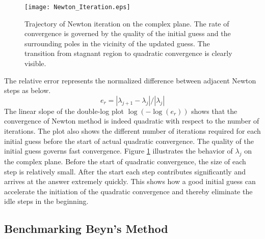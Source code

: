 \documentclass[11pt,letterpaper]{article}
\begin{document}
\begin{figure}\label{fig:NewtonIterate}
\begin{center}
\texttt{[image: Newton\_Iteration.eps]}
\end{center}
\caption{Trajectory of Newton iteration on the complex plane. \textnormal{The rate of convergence is governed by the quality of the initial guess and the surrounding poles in the vicinity of the updated guess. The transition from stagnant region to quadratic convergence is clearly visible.}} 
\end{figure}
The relative error represents the normalized difference between adjacent Newton steps as below.
\begin{equation}\label{eq:er}
e_r=|\lambda_{j+1} - \lambda_j|/|\lambda_j|
\end{equation}
The linear slope of the double-log plot $\log(-\log(e_r))$ shows that the convergence of Newton method is indeed quadratic with respect to the number of iterations. The plot also shows the different number of iterations required for each initial guess before the start of actual quadratic convergence. The quality of the initial guess governs fast convergence. Figure \ref{fig:NewtonIterate} illustrates the behavior of $\lambda_j$ on the complex plane. Before the start of quadratic convergence, the size of each step is relatively small. After the start each step contributes significantly and arrives at the answer extremely quickly. This shows how a good initial guess can accelerate the initiation of the quadratic convergence and thereby eliminate the idle steps in the beginning. 
\subsection{Benchmarking Beyn's Method}
\end{document}
